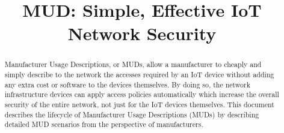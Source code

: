 \documentclass[conference]{IEEEtran}
\begin{document}
\title{MUD: Simple, Effective IoT Network Security}
\author{
\and
{}
}

\maketitle
\thispagestyle{plain}
\pagestyle{plain}
\begin{abstract}
Manufacturer Usage Descriptions, or MUDs, allow a manufacturer to
cheaply and simply describe to the network the accesses required by an
IoT device without adding any extra cost or software to the devices
themselves.  By doing so, the network infrastructure devices can apply
access policies automatically which increase the overall security of
the entire network, not just for the IoT devices themselves.  This
document describes the lifecycle of Manufacturer Usage Descriptions
(MUDs) by describing detailed MUD scenarios from the perspective of
manufacturers.
\end{abstract}
\end{document}
